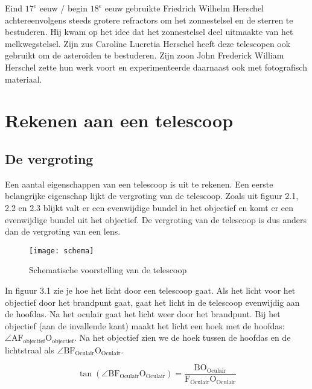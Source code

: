 Eind $17^{e}$ eeuw / begin $18^{e}$ eeuw gebruikte Friedrich Wilhelm
Herschel achtereenvolgens steeds grotere refractors om het zonnestelsel
en de sterren te bestuderen. Hij kwam op het idee dat het zonnestelsel
deel uitmaakte van het melkwegstelsel. Zijn zus Caroline Lucretia
Herschel heeft deze telescopen ook gebruikt om de asteroïden te bestuderen.
Zijn zoon John Frederick William Herschel zette hun werk voort en
experimenteerde daarnaast ook met fotografisch materiaal.


\section{Rekenen aan een telescoop}


\subsection{De vergroting}

Een aantal eigenschappen van een telescoop is uit te rekenen. Een
eerste belangrijke eigenschap lijkt de vergroting van de telescoop.
Zoals uit figuur 2.1, 2.2 en 2.3 blijkt valt er een evenwijdige bundel
in het objectief en komt er een evenwijdige bundel uit het objectief.
De vergroting van de telescoop is dus anders dan de vergroting van
een lens. 

\begin{figure}[H]
\noindent \begin{centering}
\texttt{[image: schema]}
\par\end{centering}

\caption{Schematische voorstelling van de telescoop}
\end{figure}


In figuur 3.1 zie je hoe het licht door een telescoop gaat. Als het
licht voor het objectief door het brandpunt gaat, gaat het licht in
de telescoop evenwijdig aan de hoofdas. Na het oculair gaat het licht
weer door het brandpunt. Bij het objectief (aan de invallende kant)
maakt het licht een hoek met de hoofdas: $\angle\mathrm{A}\mathrm{F_{objectief}O_{objectief}}$.
Na het objectief zien we de hoek tussen de hoofdas en de lichtstraal
als $\angle\mathrm{BF_{Oculair}O_{Oculair}}$.

\begin{equation}
\tan(\angle\mathrm{B}\mathrm{F_{Oculair}O_{Oculair}})
=\frac{\mathrm{B}\mathrm{O_{Oculair}}}{\mathrm{F_{Oculair}O_{Oculair}}}
\end{equation}


